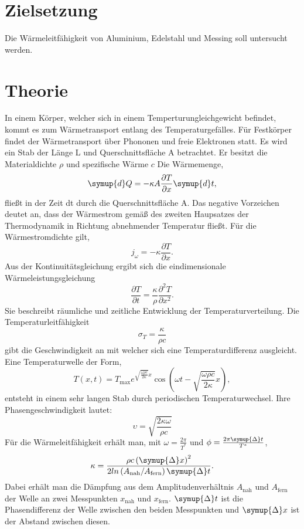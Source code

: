 \section{Zielsetzung}
Die Wärmeleitfähigkeit von Aluminium, Edelstahl und Messing soll untersucht werden.
\section{Theorie}
\label{sec:Theorie}
In einem Körper, welcher sich in einem Temperturungleichgewicht befindet, kommt es zum Wärmetransport entlang des Temperaturgefälles.
Für Festkörper findet der Wärmetransport über Phononen und freie Elektronen statt.
Es wird ein Stab der Länge L und Querschnittsfläche A betrachtet.
Er besitzt die Materialdichte $\rho$ und spezifische Wärme $c$
Die Wärmemenge,
\begin{equation}
  \label{eqn:gl1}
    \symup{d}Q =-  \kappa A \frac{\partial T}{\partial x} \symup{d}t,
\end{equation}
fließt in der Zeit dt durch die Querschnittsfläche A.
Das negative Vorzeichen deutet an, dass der Wärmestrom gemäß des zweiten Haupsatzes der 
Thermodynamik in Richtung abnehmender Temperatur fließt.
Für die Wärmestromdichte gilt,
\begin{equation}
    j_\omega =- \kappa \frac{\partial T}{\partial x}.
\end{equation}
Aus der Kontinuitätsgleichung ergibt sich die eindimensionale Wärmeleistungsgleichung
\begin{equation}
    \frac{\partial T}{\partial t} = \frac {\kappa}{\rho} \frac{\partial^2  T}{\partial x^2}.
\end{equation}
Sie beschreibt räumliche und zeitliche Entwicklung der Temperaturverteilung.
Die Temperaturleitfähigkeit
\begin{equation}
    \sigma_T = \frac{\kappa}{\rho c}
\end{equation}
gibt die Geschwindigkeit an mit welcher sich eine Temperaturdifferenz ausgleicht.
%
Eine Temperaturwelle der Form,
\begin{equation}
    T\left(x,t\right) = T_\text{max}e^{\sqrt{\frac{\omega\rho c}{2 \kappa}}x} \cos\left(\omega t - \sqrt{\frac{\omega\rho c}{2 \kappa}}x\right),
\label{eqn:thermowelle}
\end{equation}
entsteht in einem sehr langen Stab durch periodischen Temperaturwechsel.
Ihre Phasengeschwindigkeit lautet:
\begin{equation}
    \upsilon = \sqrt{\frac{2\kappa\omega}{\rho c}}
\end{equation}
Für die Wärmeleitfähigkeit erhält man, mit  $\omega=\frac{2\pi}{T^*}$ und $\phi=\frac{2\pi\symup{\Delta}t}{T^*}$,
\begin{equation}
    \kappa = \frac{\rho c\left(\symup{\Delta}x\right)^2}{2 ln\left(A_\text{nah}/A_\text{fern}\right)\symup{\Delta}t}.
    \label{eqn:wleitfaehigkeit}
\end{equation}
Dabei erhält man die Dämpfung aus dem Amplitudenverhältnis $A_\text{nah}$ und $A_\text{fern}$ der Welle an zwei Messpunkten
$x_\text{nah}$ und $x_\text{fern}$.
$\symup{\Delta}t$ ist die Phasendifferenz der Welle zwischen den beiden Messpunkten und $\symup{\Delta}x$ ist der Abstand zwischen
diesen.
